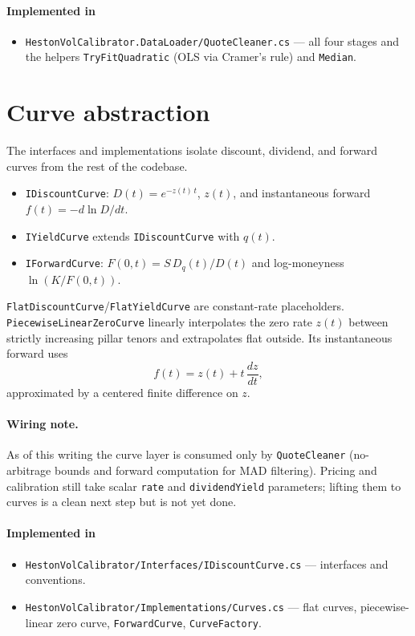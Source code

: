 \documentclass[11pt,a4paper]{article}
\begin{document}
\paragraph*{Implemented in}
\begin{itemize}
\item \texttt{HestonVolCalibrator.DataLoader/QuoteCleaner.cs} --- all four stages and the helpers \texttt{TryFitQuadratic} (OLS via Cramer's rule) and \texttt{Median}.
\end{itemize}

\section{Curve abstraction}
The interfaces and implementations isolate discount, dividend, and forward
curves from the rest of the codebase.
\begin{itemize}
\item \texttt{IDiscountCurve}: $D(t) = e^{-z(t)\, t}$, $z(t)$, and instantaneous forward $f(t) = -d \ln D/dt$.
\item \texttt{IYieldCurve} extends \texttt{IDiscountCurve} with $q(t)$.
\item \texttt{IForwardCurve}: $F(0,t) = S\, D_q(t)/D(t)$ and log-moneyness $\ln(K/F(0,t))$.
\end{itemize}
\texttt{FlatDiscountCurve}/\texttt{FlatYieldCurve} are constant-rate placeholders.
\texttt{PiecewiseLinearZeroCurve} linearly interpolates the zero rate $z(t)$
between strictly increasing pillar tenors and extrapolates flat outside.
Its instantaneous forward uses
\[
f(t) = z(t) + t\, \frac{dz}{dt},
\]
approximated by a centered finite difference on $z$.

\paragraph{Wiring note.} As of this writing the curve layer is consumed only by
\texttt{QuoteCleaner} (no-arbitrage bounds and forward computation for MAD
filtering). Pricing and calibration still take scalar \texttt{rate} and
\texttt{dividendYield} parameters; lifting them to curves is a clean next step
but is not yet done.

\paragraph*{Implemented in}
\begin{itemize}
\item \texttt{HestonVolCalibrator/Interfaces/IDiscountCurve.cs} --- interfaces and conventions.
\item \texttt{HestonVolCalibrator/Implementations/Curves.cs} --- flat curves, piecewise-linear zero curve, \texttt{ForwardCurve}, \texttt{CurveFactory}.
\end{itemize}
\end{document}
